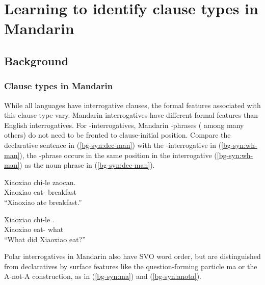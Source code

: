 \chapter{Learning to identify clause types in Mandarin}
\label{chap:man-cl}

\section{Background}
\subsection{Clause types in Mandarin}

\noindent While all languages have interrogative clauses, the formal features associated with this clause type vary. 
\noindent Mandarin interrogatives have different formal features than English interrogatives. For \twh-interrogatives, Mandarin \twh-phrases (\citealt{huang1982, cheng1991} among many others) do not need to be fronted to clause-initial position. Compare the declarative sentence in (\ref{bg-syn:dec-man}) with the \twh-interrogative in (\ref{bg-syn:wh-man}), the \twh-phrase  occurs in the same position in the interrogative (\ref{bg-syn:wh-man}) as the noun phrase  in (\ref{bg-syn:dec-man}). 


\vspace{-1.5ex} 
\noindent
\begin{minipage}[t]{0.45\linewidth}	
\gll Xiaoxiao	chi-le zaocan.\\
Xiaoxiao eat-\Asp{} breakfast \\
``Xiaoxiao ate breakfast.''
\eex
\end{minipage}
\hspace{0.5cm} %
\begin{minipage}[t]{0.5\linewidth} 
\gll Xiaoxiao	chi-le .\\
Xiaoxiao eat-\Asp{} what \\
``What did Xiaoxiao eat?''
\eex
\end{minipage}
\vspace{0.5ex}

\noindent 
Polar interrogatives in Mandarin also have SVO word order, but are distinguished from declaratives by surface features like the question-forming particle ma or the A-not-A construction, as in (\ref{bg-syn:ma}) and (\ref{bg-syn:anota}).

